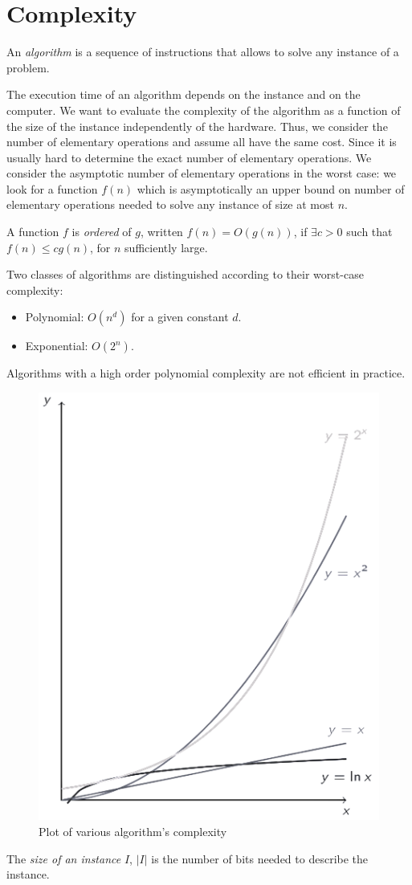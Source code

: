 \documentclass[12pt, a4paper]{report}
\newtheorem[style=M,bodystyle=\normalfont]{proposition}{Proposition}
\newtheorem[style=M,bodystyle=\normalfont]{theorem}{Theorem}
\newtheorem[style=M,bodystyle=\normalfont]{corollary}{Corollary}
\newtheorem[style=M,bodystyle=\normalfont]{lemma}{Lemma}
\newtheorem[style=M,bodystyle=\normalfont]{definition}{Definition}
\begin{document}
    \section{Complexity}
    \begin{definition}
        An \emph{algorithm} is a sequence of instructions that allows to solve any instance of a problem.
    \end{definition}
    The execution time of an algorithm depends on the instance and on the computer. We want to evaluate the complexity of the algorithm as a function of the size of the instance
    independently of the hardware. Thus, we consider the number of elementary operations and assume all have the same cost. Since it is usually hard to determine the exact number of
    elementary operations. We consider the asymptotic number of elementary operations in the worst case: we look for a function $f(n)$ which is asymptotically an upper bound on 
    number of elementary operations needed to solve any instance of size at most $n$. 
    \begin{definition}
        A function $f$ is \emph{ordered} of $g$, written $f(n)=O(g(n))$, if $\exists c > 0$ such that $f(n) \leq cg(n)$, for $n$ sufficiently large. 
    \end{definition}
    Two classes of algorithms are distinguished according to their worst-case complexity:
    \begin{itemize}
        \item Polynomial: $O(n^d)$ for a given constant $d$.
        \item Exponential: $O(2^n)$. 
    \end{itemize}
    Algorithms with a high order polynomial complexity are not efficient in practice.
    \begin{figure}[H]
        \centering
        \includegraphics[width=0.25\linewidth]{images/complexity.png}
        \caption{Plot of various algorithm's complexity}
    \end{figure}
    \begin{definition}
        The \emph{size of an instance} $I$, $\left\lvert I \right\rvert$ is the number of bits needed to describe the instance. 
    \end{definition}
\end{document}
